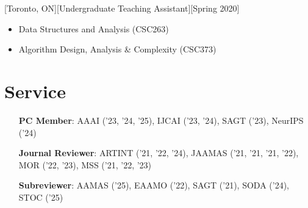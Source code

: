 \documentclass{article}
\begin{document}
    [Toronto, ON][Undergraduate Teaching Assistant][Spring 2020]
    \begin{itemize}
        \item Data Structures and Analysis (CSC263)
        \item Algorithm Design, Analysis \& Complexity (CSC373)
    \end{itemize}
    
    \section{Service}
    \begin{enumerate}[align=left]
    	\item[\textbf{PC Member}:] AAAI ('23, '24, '25), IJCAI ('23, '24), SAGT ('23), NeurIPS ('24)
    	\item[\textbf{Journal Reviewer}:] ARTINT ('21, '22, '24), JAAMAS ('21, '21, '21, '22), MOR ('22, '23), MSS ('21, '22, '23)
    	\item[\textbf{Subreviewer}:] AAMAS ('25), EAAMO ('22), SAGT ('21), SODA ('24), STOC ('25)
    \end{enumerate}
    
\end{document}
